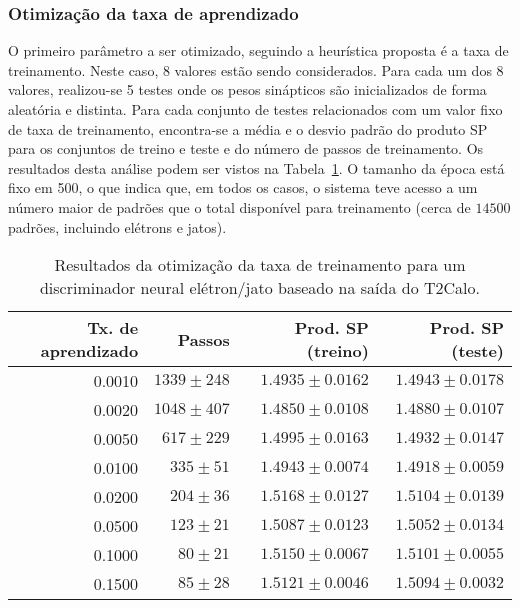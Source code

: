\subsubsection{Otimização da taxa de aprendizado}

O primeiro parâmetro a ser otimizado, seguindo a heurística proposta é a taxa
de treinamento. Neste caso, 8 valores estão sendo considerados. Para cada um
dos 8 valores, realizou-se 5 testes onde os pesos sinápticos são inicializados
de forma aleatória e distinta. Para cada conjunto de testes relacionados com
um valor fixo de taxa de treinamento, encontra-se a média e o desvio padrão do
produto SP para os conjuntos de treino e teste e do número de passos de
treinamento. Os resultados desta análise podem ser vistos na
Tabela~\ref{tab:t2calo-neural-lr-scan}. O tamanho da época está fixo em 500, o
que indica que, em todos os casos, o sistema teve acesso a um número maior de
padrões que o total disponível para treinamento (cerca de $14500$ padrões,
incluindo elétrons e jatos).

\begin{table}
\caption{Resultados da otimização da taxa de treinamento para um discriminador
neural elétron/jato baseado na saída do T2Calo.}
\label{tab:t2calo-neural-lr-scan}
\begin{center}
\begin{tabular}{|r|r|r|r|} \hline
Tx. de aprendizado & Passos & Prod. SP (treino) & Prod. SP (teste) \\
\hline 
0.0010 & $1339\pm248$ & $1.4935\pm0.0162$ & $1.4943\pm0.0178$ \\ \hline
0.0020 & $1048\pm407$ & $1.4850\pm0.0108$ & $1.4880\pm0.0107$ \\ \hline
0.0050 & $617\pm229$ & $1.4995\pm0.0163$ & $1.4932\pm0.0147$ \\ \hline
0.0100 & $335\pm51$ & $1.4943\pm0.0074$ & $1.4918\pm0.0059$ \\ \hline
0.0200 & $204\pm36$ & $1.5168\pm0.0127$ & $1.5104\pm0.0139$ \\ \hline
0.0500 & $123\pm21$ & $1.5087\pm0.0123$ & $1.5052\pm0.0134$ \\ \hline
0.1000 & $80\pm21$ & $1.5150\pm0.0067$ & $1.5101\pm0.0055$ \\ \hline
0.1500 & $85\pm28$ & $1.5121\pm0.0046$ & $1.5094\pm0.0032$ \\ \hline
\end{tabular}
\end{center}
\end{table}

